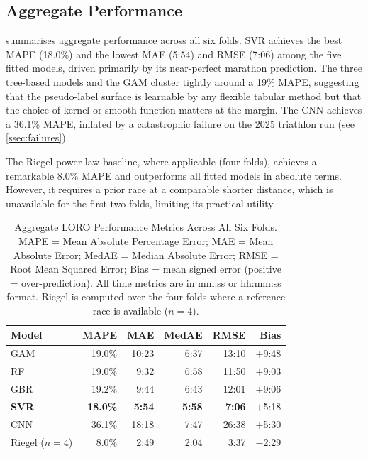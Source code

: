 \documentclass[11pt, a4paper]{article}
\begin{document}
\subsection{Aggregate Performance}
\label{ssec:aggregate}

 summarises aggregate performance across all six folds.
SVR achieves the best MAPE (18.0\%) and the lowest MAE (5:54) and RMSE (7:06)
among the five fitted models, driven primarily by its near-perfect marathon
prediction.
The three tree-based models and the GAM cluster tightly around a 19\% MAPE,
suggesting that the pseudo-label surface is learnable by any flexible tabular
method but that the choice of kernel or smooth function matters at the margin.
The CNN achieves a 36.1\% MAPE, inflated by a catastrophic failure on the
2025 triathlon run (see \cref{ssec:failures}).

The Riegel power-law baseline, where applicable (four folds), achieves a
remarkable 8.0\% MAPE and outperforms all fitted models in absolute terms.
However, it requires a prior race at a comparable shorter distance, which is
unavailable for the first two folds, limiting its practical utility.

\begin{table}[htbp]
  \centering
  \caption{Aggregate LORO Performance Metrics Across All Six Folds.
           MAPE = Mean Absolute Percentage Error; MAE = Mean Absolute Error;
           MedAE = Median Absolute Error; RMSE = Root Mean Squared Error;
           Bias = mean signed error (positive = over-prediction).
           All time metrics are in mm:ss or hh:mm:ss format.
           Riegel is computed over the four folds where a reference race
           is available ($n = 4$).}
  \label{tab:metrics}
  \small
  \begin{tabular}{lrrrrr}
    \toprule
    \textbf{Model} & \textbf{MAPE} & \textbf{MAE} & \textbf{MedAE}
                   & \textbf{RMSE} & \textbf{Bias} \\
    \midrule
    GAM              & 19.0\% & 10:23 & 6:37 & 13:10 & $+$9:48 \\
    RF               & 19.0\% & 9:32  & 6:58 & 11:50 & $+$9:03 \\
    GBR              & 19.2\% & 9:44  & 6:43 & 12:01 & $+$9:06 \\
    \textbf{SVR}     & \textbf{18.0\%} & \textbf{5:54} & \textbf{5:58}
                     & \textbf{7:06}  & $+$5:18 \\
    CNN              & 36.1\% & 18:18 & 7:47 & 26:38 & $+$5:30 \\
    \midrule
    Riegel ($n=4$)   & 8.0\%  & 2:49  & 2:04 & 3:37  & $-$2:29 \\
    \bottomrule
  \end{tabular}
\end{table}
\end{document}
